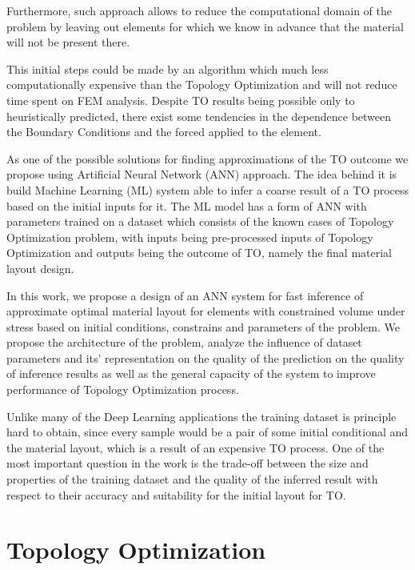 Furthermore, such approach allows to reduce the computational domain of the problem by leaving out elements for which we know in advance that the material will not be present there. 
\bigskip
{}

This initial steps could be made by an algorithm which much less computationally expensive than the Topology Optimization and will not reduce time spent on FEM analysis. 
Despite TO results being possible only to heuristically predicted, there exist some tendencies in the dependence between the Boundary Conditions and the forced applied to the element. 
\bigskip

As one of the possible solutions for finding approximations of the TO outcome we propose using Artificial Neural Network (ANN) approach.
The idea behind it is build Machine Learning (ML) system able to infer a coarse result of a TO process based on the initial inputs for it.
The ML model has a form of ANN with parameters trained on a dataset which consists of the known cases of Topology Optimization problem, with inputs being pre-processed inputs of Topology Optimization and outputs being the outcome of TO, namely the final material layout design.

In this work, we propose a design of an ANN system for fast inference of approximate optimal material layout for elements with constrained volume under stress based on initial conditions, constrains and parameters of the problem. 
We propose the architecture of the problem, analyze the influence of dataset parameters and its' representation on the quality of the prediction on the quality of inference results as well as the general capacity of the system to improve performance of Topology Optimization process.  


Unlike many of the Deep Learning applications the training dataset is principle hard to obtain, since every sample would be a pair of some initial conditional and the material layout, which is a result of an expensive TO process. 
One of the most important question in the work is the trade-off between the size and properties of the training dataset and the quality of the inferred result with respect to their accuracy and suitability for the initial layout for TO.



\section{Topology Optimization}

